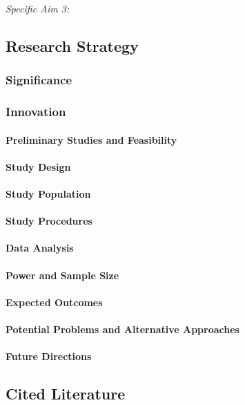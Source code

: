 \emph{Specific Aim 3:}


\subsection{Research Strategy}\label{research-strategy}


\subsubsection{Significance}\label{significance}

\subsubsection{Innovation}\label{innovation}

      \paragraph{Preliminary Studies and Feasibility}\label{preliminary-studies-and-feasibility}

\paragraph{Study Design}\label{study-design}

\paragraph{Study Population}\label{study-population}

\paragraph{Study Procedures}\label{study-procedures}

\paragraph{Data Analysis}\label{data-analysis}

\paragraph{Power and Sample Size}\label{power-and-sample-size}

\paragraph{Expected Outcomes}\label{expected-outcomes}

\paragraph{Potential Problems and Alternative
      Approaches}\label{potential-problems-and-alternative-approaches}

\paragraph{Future Directions}\label{future-directions} 
    
\subsection{Cited Literature}\label{cited-literature}
